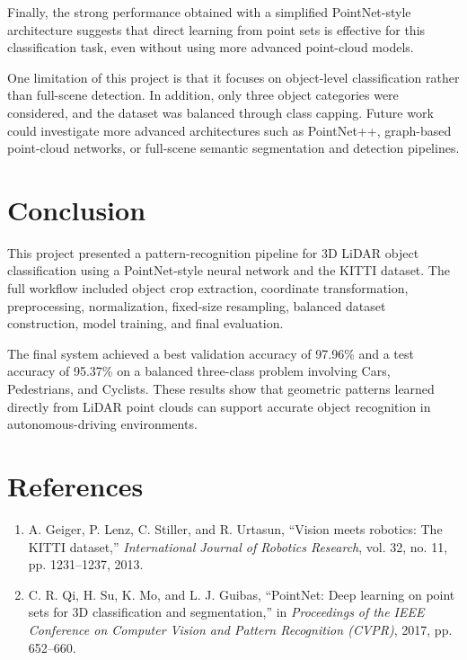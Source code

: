 \documentclass[12pt]{article}
\begin{document}
Finally, the strong performance obtained with a simplified PointNet-style architecture suggests that direct learning from point sets is effective for this classification task, even without using more advanced point-cloud models.

One limitation of this project is that it focuses on object-level classification rather than full-scene detection. In addition, only three object categories were considered, and the dataset was balanced through class capping. Future work could investigate more advanced architectures such as PointNet++, graph-based point-cloud networks, or full-scene semantic segmentation and detection pipelines.

\section{Conclusion}

This project presented a pattern-recognition pipeline for 3D LiDAR object classification using a PointNet-style neural network and the KITTI dataset. The full workflow included object crop extraction, coordinate transformation, preprocessing, normalization, fixed-size resampling, balanced dataset construction, model training, and final evaluation.

The final system achieved a best validation accuracy of 97.96\% and a test accuracy of 95.37\% on a balanced three-class problem involving Cars, Pedestrians, and Cyclists. These results show that geometric patterns learned directly from LiDAR point clouds can support accurate object recognition in autonomous-driving environments.

\section*{References}

\begin{enumerate}
    \item A. Geiger, P. Lenz, C. Stiller, and R. Urtasun, ``Vision meets robotics: The KITTI dataset,'' \textit{International Journal of Robotics Research}, vol. 32, no. 11, pp. 1231--1237, 2013.
    \item C. R. Qi, H. Su, K. Mo, and L. J. Guibas, ``PointNet: Deep learning on point sets for 3D classification and segmentation,'' in \textit{Proceedings of the IEEE Conference on Computer Vision and Pattern Recognition (CVPR)}, 2017, pp. 652--660.
\end{enumerate}
\end{document}
